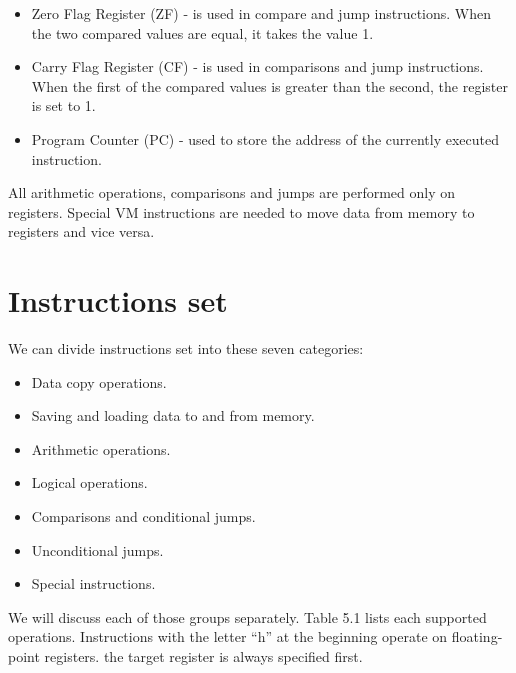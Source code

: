 \documentclass[oneside]{book}
\begin{document}
\begin{itemize}

\item Zero Flag Register (ZF) - is used in compare and jump instructions. When the two compared values are equal, it takes the value 1.

\item Carry Flag Register (CF) - is used in comparisons and jump instructions. When the first of the compared values is greater than the second, the register is set to 1.

\item Program Counter (PC) - used to store the address of the currently executed instruction.

\end{itemize}

All arithmetic operations, comparisons and jumps are performed only on registers. Special VM instructions are needed to move data from memory to registers and vice versa.

\section{Instructions set}

We can divide instructions set into these seven categories:

\begin{itemize}

\item Data copy operations.

\item Saving and loading data to and from memory.

\item Arithmetic operations.

\item Logical operations.

\item Comparisons and conditional jumps.

\item Unconditional jumps.

\item Special instructions.

\end{itemize}

We will discuss each of those groups separately.
Table 5.1 lists each supported operations. Instructions with the letter ``h'' at the beginning operate on floating-point registers. the target register is always specified first.
\end{document}
